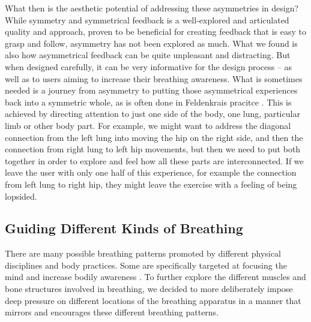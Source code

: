 What then is the aesthetic potential of addressing these asymmetries in design? While symmetry and symmetrical feedback is a well-explored and articulated quality and approach, proven to be beneficial for creating feedback that is easy to grasp and follow, asymmetry has not been explored as much. What we found is also how asymmetrical feedback can be quite unpleasant and distracting. But when designed carefully, it can be very informative for the design process -- as well as to users aiming to increase their breathing awareness. What is sometimes needed is a journey from asymmetry to putting those asymmetrical experiences back into a symmetric whole, as is often done in Feldenkrais pracitce \cite{worth_symmetry_2015}. This is achieved by directing attention to just one side of the body, one lung, particular limb or other body part. For example, we might want to address the diagonal connection from the left lung into moving the hip on the right side, and then the connection from right lung to left hip movements, but then we need to put both together in order to explore and feel how all these parts are interconnected. If we leave the user with only one half of this experience, for example the connection from left lung to right hip, they might leave the exercise with a feeling of being lopsided.


\subsection*{Guiding Different Kinds of Breathing}

There are many possible breathing patterns promoted by different physical disciplines and body practices. Some are specifically targeted at focusing the mind and increase bodily awareness \cite{kupershmidt_definition_2019, burke_role_2008}. To further explore the different muscles and bone structures involved in breathing, we decided to more deliberately impose deep pressure on different locations of the breathing apparatus in a manner that mirrors and encourages these different breathing patterns.

